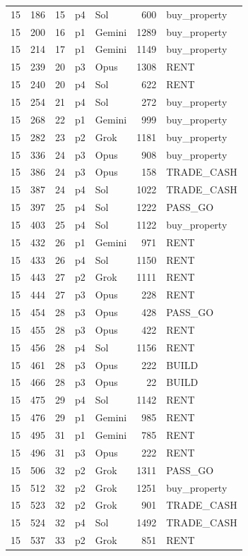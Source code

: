 \begin{longtable}{r r r l l r >{\ttfamily}l}
15 & 186 & 15 & p4 & Sol & 600 & buy\_property \\
15 & 200 & 16 & p1 & Gemini & 1289 & buy\_property \\
15 & 214 & 17 & p1 & Gemini & 1149 & buy\_property \\
15 & 239 & 20 & p3 & Opus & 1308 & RENT \\
15 & 240 & 20 & p4 & Sol & 622 & RENT \\
15 & 254 & 21 & p4 & Sol & 272 & buy\_property \\
15 & 268 & 22 & p1 & Gemini & 999 & buy\_property \\
15 & 282 & 23 & p2 & Grok & 1181 & buy\_property \\
15 & 336 & 24 & p3 & Opus & 908 & buy\_property \\
15 & 386 & 24 & p3 & Opus & 158 & TRADE\_CASH \\
15 & 387 & 24 & p4 & Sol & 1022 & TRADE\_CASH \\
15 & 397 & 25 & p4 & Sol & 1222 & PASS\_GO \\
15 & 403 & 25 & p4 & Sol & 1122 & buy\_property \\
15 & 432 & 26 & p1 & Gemini & 971 & RENT \\
15 & 433 & 26 & p4 & Sol & 1150 & RENT \\
15 & 443 & 27 & p2 & Grok & 1111 & RENT \\
15 & 444 & 27 & p3 & Opus & 228 & RENT \\
15 & 454 & 28 & p3 & Opus & 428 & PASS\_GO \\
15 & 455 & 28 & p3 & Opus & 422 & RENT \\
15 & 456 & 28 & p4 & Sol & 1156 & RENT \\
15 & 461 & 28 & p3 & Opus & 222 & BUILD \\
15 & 466 & 28 & p3 & Opus & 22 & BUILD \\
15 & 475 & 29 & p4 & Sol & 1142 & RENT \\
15 & 476 & 29 & p1 & Gemini & 985 & RENT \\
15 & 495 & 31 & p1 & Gemini & 785 & RENT \\
15 & 496 & 31 & p3 & Opus & 222 & RENT \\
15 & 506 & 32 & p2 & Grok & 1311 & PASS\_GO \\
15 & 512 & 32 & p2 & Grok & 1251 & buy\_property \\
15 & 523 & 32 & p2 & Grok & 901 & TRADE\_CASH \\
15 & 524 & 32 & p4 & Sol & 1492 & TRADE\_CASH \\
15 & 537 & 33 & p2 & Grok & 851 & RENT \\

\end{longtable}
